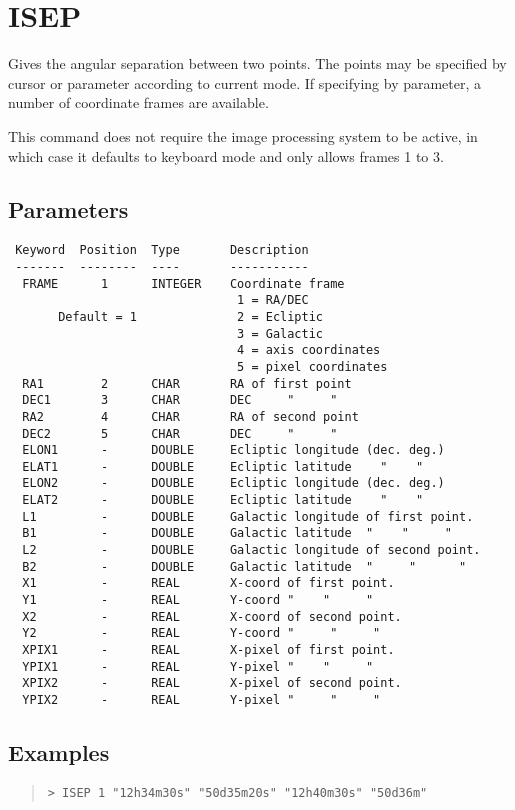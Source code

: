 \documentclass{book}
\renewcommand{\_}{{\tt\char'137}}     %
\begin{document}
\section{ISEP}
Gives the angular separation between two points. The points
may be specified by cursor or parameter according to current
mode. If specifying by parameter, a number of coordinate
frames are available.

This command does not require the image processing system to
be active, in which case it defaults to keyboard mode and only
allows frames 1 to 3.

\subsection{Parameters}
\begin{verbatim}
 Keyword  Position  Type       Description
 -------  --------  ----       -----------
  FRAME      1      INTEGER    Coordinate frame
                                1 = RA/DEC
       Default = 1              2 = Ecliptic
                                3 = Galactic
                                4 = axis coordinates
                                5 = pixel coordinates
  RA1        2      CHAR       RA of first point
  DEC1       3      CHAR       DEC     "     "
  RA2        4      CHAR       RA of second point
  DEC2       5      CHAR       DEC     "     "
  ELON1      -      DOUBLE     Ecliptic longitude (dec. deg.)
  ELAT1      -      DOUBLE     Ecliptic latitude    "    "
  ELON2      -      DOUBLE     Ecliptic longitude (dec. deg.)
  ELAT2      -      DOUBLE     Ecliptic latitude    "    "
  L1         -      DOUBLE     Galactic longitude of first point.
  B1         -      DOUBLE     Galactic latitude  "    "     "
  L2         -      DOUBLE     Galactic longitude of second point.
  B2         -      DOUBLE     Galactic latitude  "     "      "
  X1         -      REAL       X-coord of first point.
  Y1         -      REAL       Y-coord "    "     "
  X2         -      REAL       X-coord of second point.
  Y2         -      REAL       Y-coord "     "     "
  XPIX1      -      REAL       X-pixel of first point.
  YPIX1      -      REAL       Y-pixel "    "     "
  XPIX2      -      REAL       X-pixel of second point.
  YPIX2      -      REAL       Y-pixel "     "     "

\end{verbatim}\subsection{Examples}
\begin{quote}\begin{verbatim}
> ISEP 1 "12h34m30s" "50d35m20s" "12h40m30s" "50d36m"
\end{verbatim}\end{quote}
\end{document}
